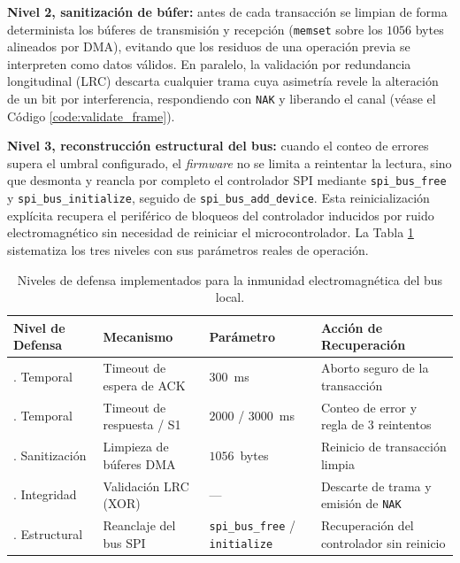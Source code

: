\par \textbf{Nivel 2, sanitización de búfer:} antes de cada transacción se limpian de forma determinista los búferes de transmisión y recepción (\texttt{memset} sobre los $1056$ bytes alineados por DMA), evitando que los residuos de una operación previa se interpreten como datos válidos. En paralelo, la validación por redundancia longitudinal (LRC) descarta cualquier trama cuya asimetría revele la alteración de un bit por interferencia, respondiendo con \texttt{NAK} y liberando el canal (véase el Código \ref{code:validate_frame}).\\

\par \textbf{Nivel 3, reconstrucción estructural del bus:} cuando el conteo de errores supera el umbral configurado, el \textit{firmware} no se limita a reintentar la lectura, sino que desmonta y reancla por completo el controlador SPI mediante \texttt{spi\_bus\_free} y \texttt{spi\_bus\_initialize}, seguido de \texttt{spi\_bus\_add\_device}. Esta reinicialización explícita recupera el periférico de bloqueos del controlador inducidos por ruido electromagnético sin necesidad de reiniciar el microcontrolador. La Tabla \ref{tab:defensa_bus} sistematiza los tres niveles con sus parámetros reales de operación.\\

\begin{table}[htbp]
\centering
\caption{Niveles de defensa implementados para la inmunidad electromagnética del bus local.}
\label{tab:defensa_bus}
\begin{tabularx}{\textwidth}{@{}>{\raggedright\arraybackslash}p{2.8cm} >{\raggedright\arraybackslash}p{3.4cm} >{\raggedright\arraybackslash}p{3.0cm} >{\raggedright\arraybackslash}X@{}}
\toprule
\textbf{Nivel de Defensa} & \textbf{Mecanismo} & \textbf{Parámetro} & \textbf{Acción de Recuperación} \\
\midrule
1. Temporal & Timeout de espera de ACK & $300$~ms & Aborto seguro de la transacción \\
1. Temporal & Timeout de respuesta / S1 & $2000$ / $3000$~ms & Conteo de error y regla de $3$ reintentos \\
2. Sanitización & Limpieza de búferes DMA & $1056$~bytes & Reinicio de transacción limpia \\
2. Integridad & Validación LRC (XOR) & --- & Descarte de trama y emisión de \texttt{NAK} \\
3. Estructural & Reanclaje del bus SPI & \texttt{spi\_bus\_free} / \texttt{initialize} & Recuperación del controlador sin reinicio \\
\bottomrule
\end{tabularx}
\end{table}


